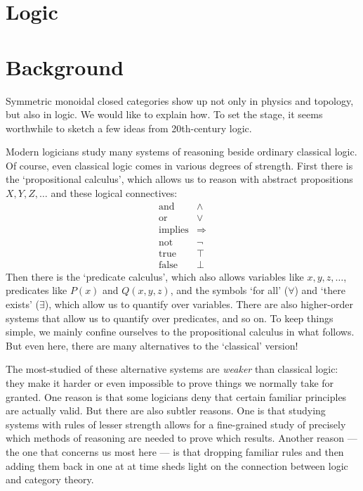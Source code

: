\documentclass[12pt,twoside,openright]{report}
\renewcommand{\text}{\mbox}
\begin{document}
\section{Logic}
\label{logic}
\EnableBpAbbreviations 

\section{Background}
\label{logic_overview}

Symmetric monoidal closed categories show up not only in physics and topology, but also in logic.  We would like to explain how. To set the stage, it seems worthwhile to sketch a few ideas from
20th-century logic.  

Modern logicians study many systems of reasoning beside ordinary classical logic.  Of course, even classical logic comes in various degrees of strength.  First there is the `propositional calculus', which allows us to reason with abstract propositions 
$X, Y, Z, \dots$ and these logical connectives:
\[  
\begin{array}{cc}
\text{and}        & \wedge   \\
\text{or}         & \vee  \\
\text{implies}    & \Rightarrow \\
\text{not}        & \neg  \\
\text{true}       & \top     \\
\text{false}      & \bot
\end{array}
\]
Then there is the `predicate calculus', which also allows variables like $x,y,z, \dots$, predicates like 
$P(x)$ and $Q(x,y,z)$, and the symbols `for all' ($\forall$) 
and `there exists' ($\exists$), which allow us to quantify over variables. There are also higher-order systems that allow us to quantify over predicates, and so on.  To keep things simple, we mainly confine ourselves to the propositional calculus in what follows.  But even here, there are many alternatives to the `classical' version!

The most-studied of these alternative systems are {\it weaker} 
than classical logic: they make it harder or even impossible to prove things we normally take for granted.  One reason is that some logicians deny that certain familiar principles are actually valid.  But there are also subtler reasons.   One is that studying systems with rules of lesser strength allows for a fine-grained study of precisely which methods of reasoning are needed to prove which results.  Another reason --- the one that concerns us most here --- 
is that dropping familiar rules and then adding them back in one at at time sheds light on the connection between logic and category theory.
\end{document}
